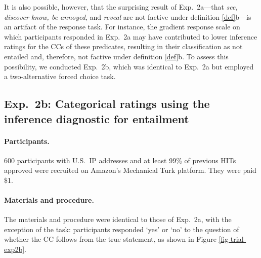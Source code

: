\documentclass{language}
\newcommand{\6}{\mbox{$[\hspace*{-.6mm}[$}}
\newcommand{\9}{\mbox{$]\hspace*{-.6mm}]$}}
\begin{document}
It is also possible, however, that the surprising result of Exp.~2a---that {\em see, discover know, be annoyed}, and {\em reveal} are not factive under definition \ref{def}b---is an artifact of the response task. For instance, the gradient response scale on which participants responded in Exp.~2a may have contributed to lower inference ratings for the CCs of these predicates, resulting in their classification as not entailed and, therefore, not factive under definition \ref{def}b. To assess this possibility, we conducted Exp.~2b, which was identical to Exp.~2a but employed a two-alternative forced choice task.

\subsection{Exp.~2b: Categorical ratings using the inference diagnostic for entailment}


\paragraph{Participants.} 600 participants with U.S.\ IP addresses and at least 99\% of previous HITs approved were recruited on Amazon's Mechanical Turk platform. They were paid \$1.

\paragraph{Materials and procedure.} The materials and procedure were identical to those of Exp.~2a, with the exception of the task: participants responded `yes' or `no' to the question of whether the CC follows from the true statement, as shown in Figure \ref{fig-trial-exp2b}.
\end{document}
